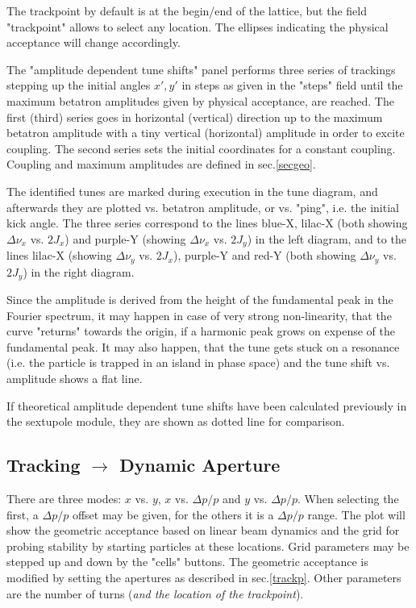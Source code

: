 \documentclass[12pt]{article}
\begin{document}
The trackpoint by default is at the begin/end of the lattice, but the field
"trackpoint" allows to select any location. The ellipses indicating the physical
acceptance will change accordingly.

The "amplitude dependent tune shifts" panel performs three series of trackings
stepping up the initial angles $x',y'$ in steps as given in the "steps" field
until the maximum betatron amplitudes given by physical
acceptance, are reached.
The first (third) series goes in horizontal (vertical) direction up to the maximum betatron amplitude with a tiny vertical (horizontal) amplitude in order to excite coupling.
The second series sets the initial coordinates for a constant coupling.
Coupling and maximum amplitudes are defined in sec.\ref{secgeo}.

The identified tunes are marked during execution
in the tune diagram, and afterwards they are plotted vs. betatron amplitude, or vs. "ping", i.e. the initial
kick angle. The three series correspond to the lines blue-X, lilac-X
(both showing $\Delta\nu_x$ vs. $2J_x$) and purple-Y (showing $\Delta\nu_x$ vs. $2J_y$) in the
left diagram, and to the lines
lilac-X (showing $\Delta\nu_y$ vs. $2J_x$), purple-Y and red-Y (both showing $\Delta\nu_y$ vs. $2J_y$) in the right diagram.

Since the amplitude is derived from the height of the fundamental peak in the Fourier spectrum, it may happen in case of very strong non-linearity, that the curve "returns" towards the origin, if a harmonic peak grows on expense of the fundamental peak. It may also happen, that the tune gets stuck on a resonance (i.e.
the particle is trapped in an island in phase space) and the tune shift vs. amplitude shows a flat line.

If theoretical amplitude dependent tune shifts have been calculated previously in the
sextupole module, they are shown as dotted line for comparison.



\subsection{\label{ssectda}Tracking $\longrightarrow$ Dynamic Aperture}
There are three modes: $x$ vs. $y$, $x$ vs. $\Delta p/p$ and $y$ vs. $\Delta p/p$.
When selecting the first, a $\Delta p/p$ offset may be given, for
the others it is a $\Delta p/p$ range. The plot will show the geometric
acceptance based on linear beam dynamics and the grid for probing stability
by starting particles at these locations. Grid parameters may be stepped
up and down by the "cells" buttons. The geometric acceptance is modified
by setting the apertures as described in sec.\ref{trackp}.
Other parameters are the number of turns ({\it and the location of the trackpoint}).
\end{document}
